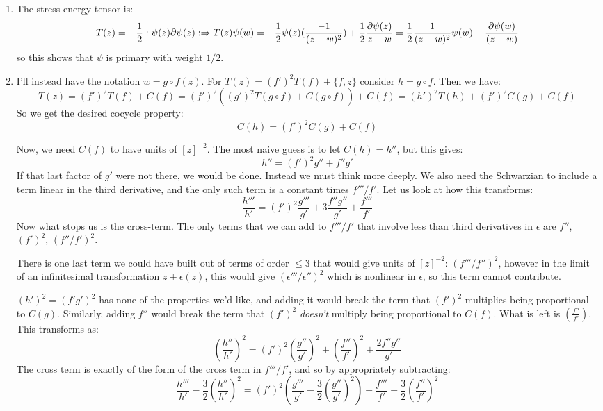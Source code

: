 \documentclass[11pt]{article}
\begin{document}
\begin{enumerate}
	\item The stress energy tensor is:
	\[
		T(z) = - \frac12 :\psi(z) \partial \psi(z): \Rightarrow T(z) \psi(w) = -\frac12 \psi(z) (\frac{-1}{(z-w)^2}) + \frac12 \frac{\partial \psi(z)}{z-w} = \frac12 \frac{1}{(z-w)^2} \psi(w) + \frac{\partial \psi(w)}{(z-w)}
	\]
	so this shows that $\psi$ is primary with weight $1/2$.
	
	\item I'll instead have the notation $w = g \circ f(z)$. For $T(z) = (f')^2 T(f) + \{f, z\}$ consider $h = g \circ f$. Then we have:
	\[
		T(z) = (f')^2 T(f) + C(f) = (f')^2 ((g')^2 T(g \circ f) + C(g \circ f)) + C(f) = (h')^2 T(h) + (f')^2 C(g) + C(f)
	\]
	So we get the desired cocycle property: 
	\[
		C(h) = (f')^2 C(g) + C(f)
	\]
	
	Now, we need $C(f)$ to have units of $[z]^{-2}$. The most naive guess is to let $C(h) = h''$, but this gives:
	\[
		h'' = (f')^2 g'' + f'' g'
	\]
	If that last factor of $g'$ were not there, we would be done. Instead we must think more deeply. 
	We also need the Schwarzian to include a term linear in the third derivative, and the only such term is a constant times $f'''/f'$. Let us look at how this transforms:
	\[
		\frac{h'''}{h'} = (f')^2 \frac{g'''}{g'} + 3 \frac{f'' g''}{g'} + \frac{f'''}{f'}
	\]
	Now what stops us is the cross-term. The only terms that we can add to $f'''/f'$ that involve less than third derivatives in $\epsilon$ are $f''$, $(f')^2$, $(f''/f')^2$.
	
	There is one last term we could have built out of terms of order $\leq 3$ that would give units of $[z]^{-2}$: $(f'''/f'')^2$, however in the limit of an infinitesimal transformation $z + \epsilon(z)$, this would give $(\epsilon'''/\epsilon'')^2$ which is nonlinear in $\epsilon$, so this term cannot contribute.
	
	$(h')^2 = (f' g')^2$ has none of the properties we'd like, and adding it would break the term that $(f')^2$ multiplies being proportional to $C(g)$. Similarly, adding $f''$ would break the term that $(f')^2$ \emph{doesn't} multiply being proportional to $C(f)$. What is left is  $\left(\frac{f''}{f'}\right)$. This transforms as:
	\[
		\left(\frac{h''}{h'}\right)^2 = (f')^2 \left(\frac{g''}{g'}\right)^2 +  \left(\frac{f''}{f'}\right)^2 + \frac{2 f'' g''}{g'} 
	\]
	The cross term is exactly of the form of the cross term in $f'''/f'$, and so by appropriately subtracting:
	\[
		\frac{h'''}{h'} - \frac32 \left(\frac{h''}{h'}\right)^2 = (f')^2 \left( \frac{g'''}{g'} - \frac32 \left(\frac{g''}{g'}\right)^2 \right) + \frac{f'''}{f'} - \frac32 \left(\frac{f''}{f'}\right)^2
	\]
	

\end{enumerate}
\end{document}
